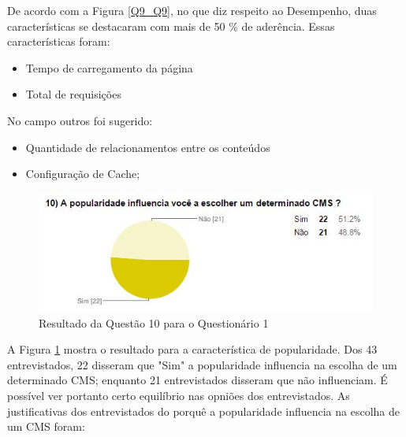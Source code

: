 De acordo com a Figura \ref{Q9_Q9}, no que diz respeito ao Desempenho, duas características se destacaram com mais de 50 \% de aderência. Essas características foram:

\begin{itemize}
    \item Tempo de carregamento da página
    \item Total de requisições     
    \end{itemize}
    
No campo outros foi sugerido:


\begin{itemize}
    \item  Quantidade de relacionamentos entre os conteúdos
    \item Configuração de Cache;    
    \end{itemize}
    
\begin{figure}[!htb]
\centering
\includegraphics[keepaspectratio=true,scale=0.9]{figuras/Ques_1/q10.jpg}
\caption{Resultado da Questão 10 para o Questionário 1}
\label{Q10_Q1}
\end{figure}


A Figura \ref{Q10_Q1} mostra o resultado para a característica de popularidade. Dos 43 entrevistados, 22 disseram que "Sim" a popularidade influencia na escolha de um determinado CMS; enquanto 21 entrevistados disseram que não influenciam. É possível ver portanto certo equilíbrio nas opniões dos entrevistados. As justificativas dos entrevistados do porquê a popularidade influencia na escolha de um CMS foram: 

